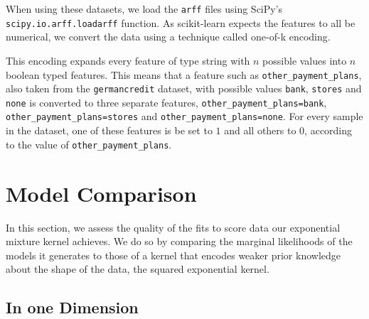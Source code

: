 \documentclass[a4paper,12pt,twoside,openright]{report}
\begin{document}
When using these datasets, we load the \texttt{arff} files using SciPy's \texttt{scipy.io.arff.loadarff} function. As scikit-learn expects the features to all be numerical, we convert the data using a technique called one-of-k encoding.


This encoding expands every feature of type string with $n$ possible values into $n$ boolean typed features. This means that a feature such as \texttt{other\_payment\_plans}, also taken from the \texttt{germancredit} dataset, with possible values \texttt{bank}, \texttt{stores} and \texttt{none} is converted to three separate features, \texttt{other\_payment\_plans=bank}, \texttt{other\_payment\_plans=stores} and \texttt{other\_payment\_plans=none}. For every sample in the dataset, one of these features is be set to $1$ and all others to $0$, according to the value of \texttt{other\_payment\_plans}.


\section{Model Comparison}
In this section, we assess the quality of the fits to score data our exponential mixture kernel achieves. We do so by comparing the marginal likelihoods of the models it generates to those of a kernel that encodes weaker prior knowledge about the shape of the data, the squared exponential kernel.




\subsection{In one Dimension}
\end{document}
